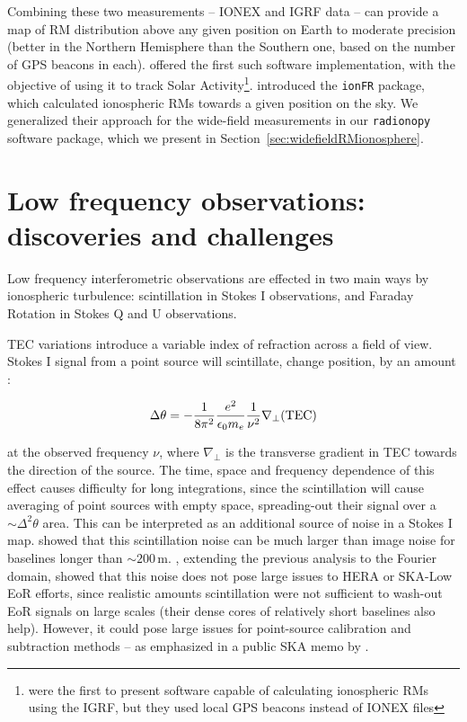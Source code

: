 Combining these two measurements -- IONEX and IGRF data -- can provide a map of RM distribution above any given position on Earth to moderate precision (better in the Northern Hemisphere than the Southern one, based on the number of GPS beacons in each). \cite{Afaraimovich.08} offered the first such software implementation, with the objective of using it to track Solar Activity\footnote{\cite{Erickson.01} were the first to present software capable of calculating ionospheric RMs using the IGRF, but they used local GPS beacons instead of IONEX files}. \cite{Sotomayor-Beltran.13} introduced the {\tt ionFR} package, which calculated ionospheric RMs towards a given position on the sky. We generalized their approach for the wide-field measurements in our {\tt radionopy} software package, which we present in Section~\ref{sec:widefieldRMionosphere}.

\section{Low frequency observations: discoveries and challenges}
\label{sec:lowfreqionosphere}

Low frequency interferometric observations are effected in two main ways by ionospheric turbulence: scintillation in Stokes I observations, and Faraday Rotation in Stokes Q and U observations. 

TEC variations introduce a variable index of refraction across a field of view. Stokes I signal from a point source will scintillate, change position, by an amount \citep[e.g.][]{TMS}:

\begin{equation}
\Delta\theta = - \frac{1}{8\pi^2} \frac{e^2}{\epsilon_0 m_e}\frac{1}{\nu^2} \nabla_{\perp}({\rm TEC})
\label{eq:ionosphere_scintillation}
\end{equation}

at the observed frequency $\nu$, where $\nabla_{\perp}$ is the transverse gradient in TEC towards the direction of the source. The time, space and frequency dependence of this effect causes difficulty for long integrations, since the scintillation will cause averaging of point sources with empty space, spreading-out their signal over a $\sim\Delta^2\theta$ area. This can be interpreted as an additional source of noise in a Stokes I map. \cite{Vedantham.15} showed that this scintillation noise can be much larger than image noise for baselines longer than $\sim 200$\,m. \cite{Vedantham.16}, extending the previous analysis to the Fourier domain, showed that this noise does not pose large issues to HERA or SKA-Low EoR efforts, since realistic amounts scintillation were not sufficient to wash-out EoR signals on large scales (their dense cores of relatively short baselines also help). However, it could pose large issues for point-source calibration and subtraction methods -- as emphasized in a public SKA memo by \cite{Cornwell.16}.

